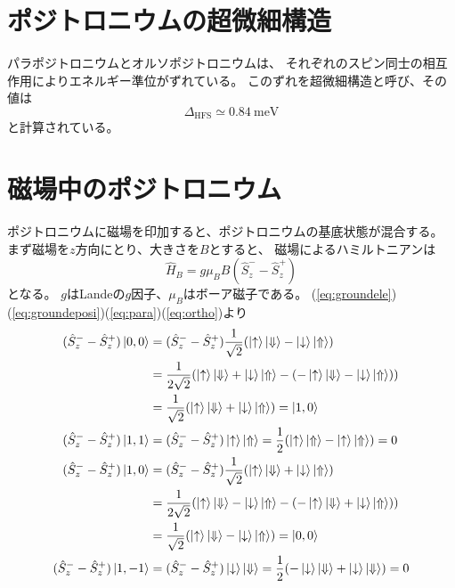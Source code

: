 \section{ポジトロニウムの超微細構造}

パラポジトロニウムとオルソポジトロニウムは、
それぞれのスピン同士の相互作用によりエネルギー準位がずれている。
このずれを超微細構造と呼び、その値は
\begin{equation}
\Delta_{\mathrm{HFS}} \simeq 0.84\ \mathrm{meV}
\end{equation}
と計算されている。


\section{磁場中のポジトロニウム}
ポジトロニウムに磁場を印加すると、ポジトロニウムの基底状態が混合する。
まず磁場を$z$方向にとり、大きさを$B$とすると、
磁場によるハミルトニアンは
\begin{equation}
\hat{H}_{B} = g\mu_{B}B(\hat{S}^{-}_{z} - \hat{S}^{+}_{z})
\end{equation}
となる。
$g$はLandeの$g$因子、$\mu_{B}$はボーア磁子である。%
(\ref{eq:groundele})(\ref{eq:groundeposi})(\ref{eq:para})(\ref{eq:ortho})より
\begin{align}
(\hat{S}^{-}_{z} - \hat{S}^{+}_{z})\ket{0,0} &= (\hat{S}^{-}_{z} - \hat{S}^{+}_{z})\frac{1}{\sqrt{2}} ( \ket{ \uparrow } \ket{ \Downarrow } - \ket{ \downarrow } \ket{ \Uparrow }) \notag \\
&= \frac{1}{2\sqrt{2}} ( \ket{ \uparrow } \ket{ \Downarrow } + \ket{ \downarrow } \ket{ \Uparrow } - ( - \ket{ \uparrow } \ket{ \Downarrow } - \ket{ \downarrow } \ket{ \Uparrow } )) \notag \\
&= \frac{1}{\sqrt{2}} ( \ket{ \uparrow } \ket{ \Downarrow } + \ket{ \downarrow } \ket{ \Uparrow }) = \ket{1,0} \\
(\hat{S}^{-}_{z} - \hat{S}^{+}_{z})\ket{1,1}
&= (\hat{S}^{-}_{z} - \hat{S}^{+}_{z})\ket{ \uparrow } \ket{ \Uparrow }
=\frac{1}{2}( \ket{ \uparrow } \ket{ \Uparrow } - \ket{ \uparrow } \ket{ \Uparrow } )
= 0 \\
(\hat{S}^{-}_{z} - \hat{S}^{+}_{z})\ket{1,0} &= (\hat{S}^{-}_{z} - \hat{S}^{+}_{z})\frac{1}{\sqrt{2}} ( \ket{ \uparrow } \ket{ \Downarrow } + \ket{ \downarrow } \ket{ \Uparrow }) \notag \\
&= \frac{1}{2\sqrt{2}} ( \ket{ \uparrow } \ket{ \Downarrow } - \ket{ \downarrow } \ket{ \Uparrow } - ( - \ket{ \uparrow } \ket{ \Downarrow } + \ket{ \downarrow } \ket{ \Uparrow } )) \notag \\
&= \frac{1}{\sqrt{2}} ( \ket{ \uparrow } \ket{ \Downarrow } - \ket{ \downarrow } \ket{ \Uparrow }) = \ket{0,0} \\
(\hat{S}^{-}_{z} - \hat{S}^{+}_{z})\ket{1,-1}
&= (\hat{S}^{-}_{z} - \hat{S}^{+}_{z})\ket{ \downarrow } \ket{ \Downarrow }
=\frac{1}{2}( - \ket{ \downarrow } \ket{ \Downarrow } + \ket{ \downarrow } \ket{ \Downarrow } )
= 0
\end{align}
